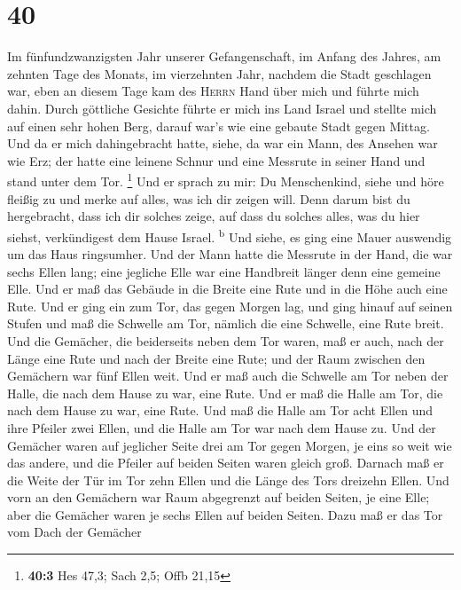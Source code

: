 \hypertarget{section-39}{%
\section{40}\label{section-39}}

 Im fünfundzwanzigsten Jahr unserer Gefangenschaft, im
Anfang des Jahres, am zehnten Tage des Monats, im vierzehnten Jahr,
nachdem die Stadt geschlagen war, eben an diesem Tage kam des
\textsc{Herrn} Hand über mich und führte mich dahin. 
Durch göttliche Gesichte führte er mich ins Land Israel und stellte mich
auf einen sehr hohen Berg, darauf war's wie eine gebaute Stadt gegen
Mittag.  Und da er mich dahingebracht hatte, siehe, da war
ein Mann, des Ansehen war wie Erz; der hatte eine leinene Schnur und
eine Messrute in seiner Hand und stand unter dem Tor. \footnote{\textbf{40:3}
  Hes 47,3; Sach 2,5; Offb 21,15}  Und er sprach zu mir:
Du Menschenkind, siehe und höre fleißig zu und merke auf alles, was ich
dir zeigen will. Denn darum bist du hergebracht, dass ich dir solches
zeige, auf dass du solches alles, was du hier siehst, verkündigest dem
Hause Israel. \textsuperscript{b}  Und siehe, es ging eine
Mauer auswendig um das Haus ringsumher. Und der Mann hatte die Messrute
in der Hand, die war sechs Ellen lang; eine jegliche Elle war eine
Handbreit länger denn eine gemeine Elle. Und er maß das Gebäude in die
Breite eine Rute und in die Höhe auch eine Rute.  Und er
ging ein zum Tor, das gegen Morgen lag, und ging hinauf auf seinen
Stufen und maß die Schwelle am Tor, nämlich die eine Schwelle, eine Rute
breit.  Und die Gemächer, die beiderseits neben dem Tor
waren, maß er auch, nach der Länge eine Rute und nach der Breite eine
Rute; und der Raum zwischen den Gemächern war fünf Ellen weit. Und er
maß auch die Schwelle am Tor neben der Halle, die nach dem Hause zu war,
eine Rute.  Und er maß die Halle am Tor, die nach dem
Hause zu war, eine Rute.  Und maß die Halle am Tor acht
Ellen und ihre Pfeiler zwei Ellen, und die Halle am Tor war nach dem
Hause zu.  Und der Gemächer waren auf jeglicher Seite
drei am Tor gegen Morgen, je eins so weit wie das andere, und die
Pfeiler auf beiden Seiten waren gleich groß.  Darnach maß
er die Weite der Tür im Tor zehn Ellen und die Länge des Tors dreizehn
Ellen.  Und vorn an den Gemächern war Raum abgegrenzt auf
beiden Seiten, je eine Elle; aber die Gemächer waren je sechs Ellen auf
beiden Seiten.  Dazu maß er das Tor vom Dach der Gemächer
